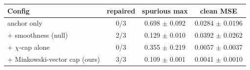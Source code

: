 \begin{tabular}{lccc}
\toprule
Config & repaired & spurious max & clean MSE \\
\midrule
anchor only & 0/3 & 0.698 $\pm$ 0.092 & 0.0284 $\pm$ 0.0196 \\
+ smoothness (null) & 2/3 & 0.129 $\pm$ 0.010 & 0.0392 $\pm$ 0.0262 \\
+ $\chi$-cap alone & 0/3 & 0.355 $\pm$ 0.219 & 0.0057 $\pm$ 0.0037 \\
+ Minkowski-vector cap (ours) & 3/3 & 0.109 $\pm$ 0.001 & 0.0041 $\pm$ 0.0010 \\
\bottomrule
\end{tabular}